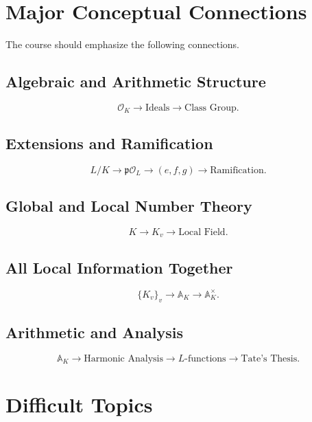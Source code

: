 \documentclass[11pt]{article}
\begin{document}
\section{Major Conceptual Connections}

The course should emphasize the following connections.

\subsection{Algebraic and Arithmetic Structure}

\[
\boxed{
\mathcal{O}_K
\rightarrow
\text{Ideals}
\rightarrow
\text{Class Group}.
}
\]

\subsection{Extensions and Ramification}

\[
\boxed{
L/K
\rightarrow
\mathfrak{p}\mathcal{O}_L
\rightarrow
(e,f,g)
\rightarrow
\text{Ramification}.
}
\]

\subsection{Global and Local Number Theory}

\[
\boxed{
K
\rightarrow
K_v
\rightarrow
\text{Local Field}.
}
\]

\subsection{All Local Information Together}

\[
\boxed{
\{K_v\}_v
\rightarrow
\mathbb{A}_K
\rightarrow
\mathbb{A}_K^\times.
}
\]

\subsection{Arithmetic and Analysis}

\[
\boxed{
\mathbb{A}_K
\rightarrow
\text{Harmonic Analysis}
\rightarrow
L\text{-functions}
\rightarrow
\text{Tate's Thesis}.
}
\]

\section{Difficult Topics}
\end{document}
